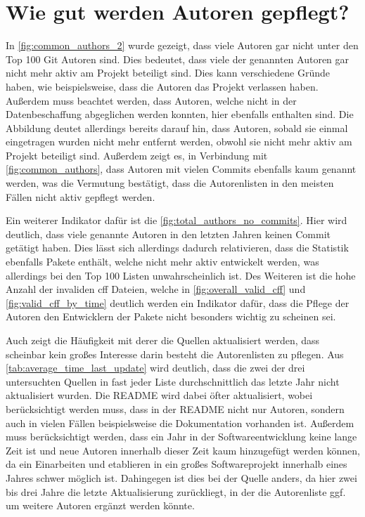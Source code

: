 \section{Wie gut werden Autoren gepflegt?}
\label{sec:autoren_pflege_diskussion}
In \autoref{fig:common_authors_2} wurde gezeigt, dass viele Autoren gar nicht unter den Top 100 Git Autoren sind.
Dies bedeutet, dass viele der genannten Autoren gar nicht mehr aktiv am Projekt beteiligt sind.
Dies kann verschiedene Gründe haben, wie beispielsweise, dass die Autoren das Projekt verlassen haben.
Außerdem muss beachtet werden, dass Autoren, welche nicht in der Datenbeschaffung abgeglichen werden konnten, hier ebenfalls enthalten sind.
Die Abbildung deutet allerdings bereits darauf hin, dass Autoren, sobald sie einmal eingetragen wurden nicht mehr entfernt werden, obwohl sie nicht mehr aktiv am Projekt beteiligt sind.
Außerdem zeigt es, in Verbindung mit \autoref{fig:common_authors}, dass Autoren mit vielen Commits ebenfalls kaum genannt werden, was die Vermutung bestätigt, dass die Autorenlisten in den meisten Fällen nicht aktiv gepflegt werden.

Ein weiterer Indikator dafür ist die \autoref{fig:total_authors_no_commits}.
Hier wird deutlich, dass viele genannte Autoren in den letzten Jahren keinen Commit getätigt haben.
Dies lässt sich allerdings dadurch relativieren, dass die Statistik ebenfalls Pakete enthält, welche nicht mehr aktiv entwickelt werden, was allerdings bei den Top 100 Listen unwahrscheinlich ist.
Des Weiteren ist die hohe Anzahl der invaliden \gls{cff} Dateien, welche in \autoref{fig:overall_valid_cff} und \autoref{fig:valid_cff_by_time} deutlich werden ein Indikator dafür, dass die Pflege der Autoren den Entwicklern der Pakete nicht besonders wichtig zu scheinen sei.

Auch zeigt die Häufigkeit mit derer die Quellen aktualisiert werden, dass scheinbar kein großes Interesse darin besteht die Autorenlisten zu pflegen.
Aus \autoref{tab:average_time_last_update} wird deutlich, dass die zwei der drei untersuchten Quellen in fast jeder Liste durchschnittlich das letzte Jahr nicht aktualisiert wurden.
Die README wird dabei öfter aktualisiert, wobei berücksichtigt werden muss, dass in der README nicht nur Autoren, sondern auch in vielen Fällen beispielsweise die Dokumentation vorhanden ist.
Außerdem muss berücksichtigt werden, dass ein Jahr in der Softwareentwicklung keine lange Zeit ist und neue Autoren innerhalb dieser Zeit kaum hinzugefügt werden können, da ein Einarbeiten und etablieren in ein großes Softwareprojekt innerhalb eines Jahres schwer möglich ist.
Dahingegen ist dies bei der  Quelle anders, da hier zwei bis drei Jahre die letzte Aktualisierung zurückliegt, in der die Autorenliste ggf. um weitere Autoren ergänzt werden könnte.

